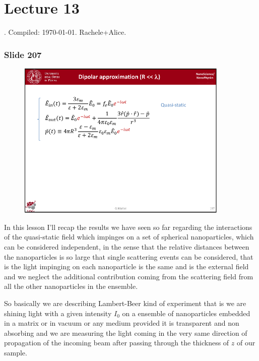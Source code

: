\documentclass[../main/main.tex]{subfiles}
\begin{document}
\section{Lecture 13}
 . Compiled:  \today. Rachele+Alice.

\subsubsection{Slide 207}

\begin{figure}[h!]
\centering
\includegraphics[page=11,width=0.9\textwidth]{../lessons/pdf_file/12_lesson.pdf}
\end{figure}

In this lesson I'll recap the results we have seen so far regarding the interactions of the quasi-static field which impinges on a set of spherical nanoparticles, which can be considered independent, in the sense that the relative distances between the nanoparticles is so large that single scattering events can be considered, that is the light impinging on each nanoparticle is the same and is the external field and we neglect the additional contribution coming from the scattering field from all the other nanoparticles in the ensemble.

So basically we are describing Lambert-Beer kind of experiment that is we are shining light with a given intensity $I_0$ on a ensemble of nanoparticles embedded in a matrix or in vacuum or any medium provided it is transparent and non absorbing and we are measuring the light coming in the very same direction of propagation of the incoming beam after passing through the thickness of $z$ of our sample.
\end{document}

